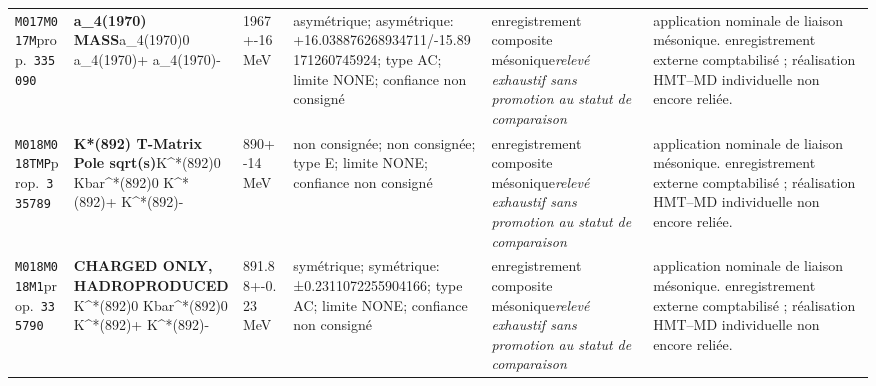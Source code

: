 \begin{landscape}
\begin{longtable}{L{1.85cm}L{4.45cm}L{2.35cm}L{4.05cm}L{3.35cm}L{7.15cm}}
\texttt{M017}\newline \texttt{M017M}\newline prop.\ \texttt{335090} & \textbf{a\_\allowbreak{}4(1970) MASS}\newline a\_\allowbreak{}4(1970)0 \textbar{}\allowbreak{} a\_\allowbreak{}4(1970)+ \textbar{}\allowbreak{} a\_\allowbreak{}4(1970)- & 1967+-16\,MeV & asymétrique; asymétrique: +16.038876268934711/-15.89171260745924; type AC; limite NONE; confiance non consigné & enregistrement composite mésonique\newline \emph{relevé exhaustif sans promotion au statut de comparaison} & application nominale de liaison mésonique. enregistrement externe comptabilisé ; réalisation HMT--MD individuelle non encore reliée. \\
\texttt{M018}\newline \texttt{M018TMP}\newline prop.\ \texttt{335789} & \textbf{K*(892) T-Matrix Pole sqrt(s)}\newline K\textasciicircum{}*(892)0 \textbar{}\allowbreak{} Kbar\textasciicircum{}*(892)0 \textbar{}\allowbreak{} K\textasciicircum{}*(892)+ \textbar{}\allowbreak{} K\textasciicircum{}*(892)- & 890+-14\,MeV & non consignée; non consignée; type E; limite NONE; confiance non consigné & enregistrement composite mésonique\newline \emph{relevé exhaustif sans promotion au statut de comparaison} & application nominale de liaison mésonique. enregistrement externe comptabilisé ; réalisation HMT--MD individuelle non encore reliée. \\
\texttt{M018}\newline \texttt{M018M1}\newline prop.\ \texttt{335790} & \textbf{CHARGED ONLY, HADROPRODUCED}\newline K\textasciicircum{}*(892)0 \textbar{}\allowbreak{} Kbar\textasciicircum{}*(892)0 \textbar{}\allowbreak{} K\textasciicircum{}*(892)+ \textbar{}\allowbreak{} K\textasciicircum{}*(892)- & 891.88+-0.23\,MeV & symétrique; symétrique: ±0.2311072255904166; type AC; limite NONE; confiance non consigné & enregistrement composite mésonique\newline \emph{relevé exhaustif sans promotion au statut de comparaison} & application nominale de liaison mésonique. enregistrement externe comptabilisé ; réalisation HMT--MD individuelle non encore reliée. \\

\end{longtable}
\end{landscape}
